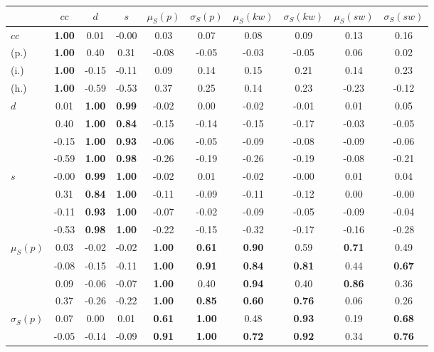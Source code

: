 \begin{table*}[h!]
\begin{center}
\begin{tabular}{| l || c | c | c | c | c | c | c | c | c |}\hline
 & $cc$ & $d$ & $s$ & $\mu_S(p)$ & $\sigma_S(p)$ & $\mu_S(kw)$ & $\sigma_S(kw)$ & $\mu_S(sw)$ & $\sigma_S(sw)$ \\\hline\hline
$cc$ & {\bf 1.00} & 0.01 & -0.00 & 0.03 & 0.07 & 0.08 & 0.09 & 0.13 & 0.16 \\
(p.) & {\bf 1.00} & 0.40 & 0.31 & -0.08 & -0.05 & -0.03 & -0.05 & 0.06 & 0.02 \\
(i.) & {\bf 1.00} & -0.15 & -0.11 & 0.09 & 0.14 & 0.15 & 0.21 & 0.14 & 0.23 \\
(h.) & {\bf 1.00} & -0.59 & -0.53 & 0.37 & 0.25 & 0.14 & 0.23 & -0.23 & -0.12 \\\hline
$d$ & 0.01 & {\bf 1.00} & {\bf 0.99} & -0.02 & 0.00 & -0.02 & -0.01 & 0.01 & 0.05 \\
 & 0.40 & {\bf 1.00} & {\bf 0.84} & -0.15 & -0.14 & -0.15 & -0.17 & -0.03 & -0.05 \\
 & -0.15 & {\bf 1.00} & {\bf 0.93} & -0.06 & -0.05 & -0.09 & -0.08 & -0.09 & -0.06 \\
 & -0.59 & {\bf 1.00} & {\bf 0.98} & -0.26 & -0.19 & -0.26 & -0.19 & -0.08 & -0.21 \\\hline
$s$ & -0.00 & {\bf 0.99} & {\bf 1.00} & -0.02 & 0.01 & -0.02 & -0.00 & 0.01 & 0.04 \\
 & 0.31 & {\bf 0.84} & {\bf 1.00} & -0.11 & -0.09 & -0.11 & -0.12 & 0.00 & -0.00 \\
 & -0.11 & {\bf 0.93} & {\bf 1.00} & -0.07 & -0.02 & -0.09 & -0.05 & -0.09 & -0.04 \\
 & -0.53 & {\bf 0.98} & {\bf 1.00} & -0.22 & -0.15 & -0.32 & -0.17 & -0.16 & -0.28 \\\hline
$\mu_S(p)$ & 0.03 & -0.02 & -0.02 & {\bf 1.00} & {\bf 0.61} & {\bf 0.90} & 0.59 & {\bf 0.71} & 0.49 \\
 & -0.08 & -0.15 & -0.11 & {\bf 1.00} & {\bf 0.91} & {\bf 0.84} & {\bf 0.81} & 0.44 & {\bf 0.67} \\
 & 0.09 & -0.06 & -0.07 & {\bf 1.00} & 0.40 & {\bf 0.94} & 0.40 & {\bf 0.86} & 0.36 \\
 & 0.37 & -0.26 & -0.22 & {\bf 1.00} & {\bf 0.85} & {\bf 0.60} & {\bf 0.76} & 0.06 & 0.26 \\\hline
$\sigma_S(p)$ & 0.07 & 0.00 & 0.01 & {\bf 0.61} & {\bf 1.00} & 0.48 & {\bf 0.93} & 0.19 & {\bf 0.68} \\
 & -0.05 & -0.14 & -0.09 & {\bf 0.91} & {\bf 1.00} & {\bf 0.72} & {\bf 0.92} & 0.34 & {\bf 0.76} \\

\end{tabular}
\end{center}
\end{table*}
